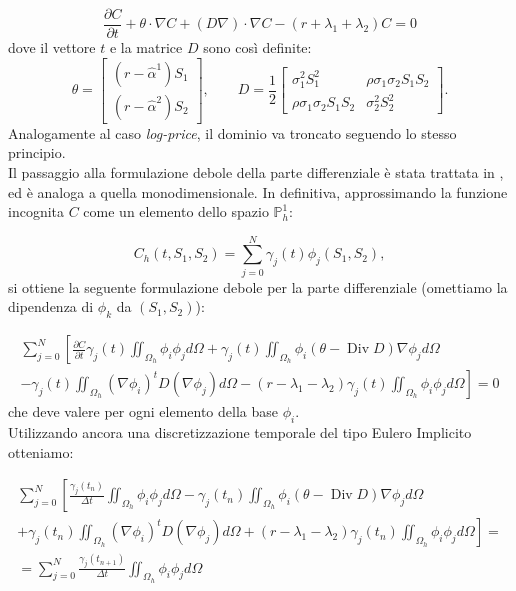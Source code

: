 \documentclass[a4paper,10pt]{report}
\newcommand{\der}[2]{\frac{\partial #1}{\partial #2}}
\theoremstyle{plain}
\theoremstyle{definition}
\theoremstyle{remark}
\DeclareMathOperator{\Div}{Div}
\begin{document}
\begin{equation}
 \der{C}{t}+\theta\cdot\nabla C+(D\nabla)\cdot\nabla C -(r+\lambda_1+\lambda_2)C=0
\end{equation}
dove il vettore $t$ e la matrice $D$ sono così definite:
\begin{equation*}
\theta=
\begin{bmatrix}
 (r-\hat{\alpha}^1)S_1\\
 (r-\hat{\alpha}^2)S_2
\end{bmatrix},
\qquad
D=\frac{1}{2}
\begin{bmatrix}
 \sigma^2_1 S_1^2 & \rho\sigma_1\sigma_2S_1S_2 \\
 \rho\sigma_1\sigma_2S_1S_2 & \sigma^2_2 S_2^2
\end{bmatrix}.
\end{equation*}
Analogamente al caso \emph{log-price}, il dominio va troncato seguendo lo stesso principio.\\
Il passaggio alla formulazione debole della parte differenziale è stata trattata in \cite{tao2009finite}, ed è analoga a quella monodimensionale. In definitiva, approssimando la funzione incognita $C$ come un elemento dello spazio $\mathbb{P}_h^1$:

\begin{equation*}
C_h(t,S_1,S_2)=\sum_{j=0}^N\gamma_j(t)\phi_j(S_1,S_2),
\end{equation*}
si ottiene la seguente formulazione debole per la parte differenziale (omettiamo la dipendenza di $\phi_k$ da $(S_1,S_2)$):

\begin{multline*}
 \sum_{j=0}^N\left[\der{C}{t}\gamma_j(t)\iint_{\Omega_h}\phi_i\phi_j d\Omega +\gamma_j(t)\iint_{\Omega_h}\phi_i(\theta-\Div D) \nabla\phi_j d\Omega\right.\\
 \left.-\gamma_j(t)\iint_{\Omega_h}(\nabla\phi_i)^t D (\nabla\phi_j) d\Omega-(r-\lambda_1-\lambda_2)\gamma_j(t)\iint_{\Omega_h}\phi_i\phi_j d\Omega \right]=0
\end{multline*}
che deve valere per ogni elemento della base $\phi_i$.\\
Utilizzando ancora una discretizzazione temporale del tipo Eulero Implicito otteniamo:

\begin{multline*}
 \sum_{j=0}^N\left[\frac{\gamma_j(t_n)}{\Delta t}\iint_{\Omega_h}\phi_i\phi_j d\Omega -\gamma_j(t_n)\iint_{\Omega_h}\phi_i(\theta-\Div D)\nabla\phi_j d\Omega\right.\\
 \left.+\gamma_j(t_n)\iint_{\Omega_h}(\nabla\phi_i)^t D (\nabla\phi_j) d\Omega+(r-\lambda_1-\lambda_2)\gamma_j(t_n)\iint_{\Omega_h}\phi_i\phi_j d\Omega \right]=\\
 =\sum_{j=0}^N\frac{\gamma_j(t_{n+1})}{\Delta t}\iint_{\Omega_h}\phi_i\phi_j d\Omega
\end{multline*}
\end{document}
